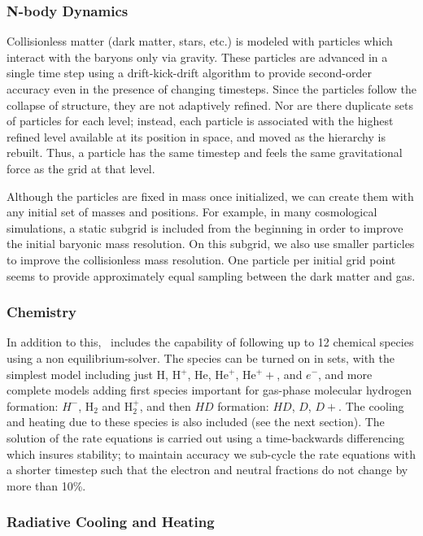 \subsubsection{N-body Dynamics}

Collisionless matter (dark matter, stars, etc.) is modeled with particles which interact with the baryons only via gravity.  These particles are advanced in a single time step using a drift-kick-drift algorithm to provide second-order accuracy even in the presence of changing timesteps.  Since the particles follow the collapse of structure, they are not adaptively refined.  Nor are there duplicate sets of particles for each level; instead, each particle is associated with the highest refined
level available at its position in space, and moved as the hierarchy is rebuilt.  Thus, a particle has the same timestep and feels the same gravitational force as the grid at that level.

Although the particles are fixed in mass once initialized, we can
create them with any initial set of masses and positions.  For example, in
many cosmological simulations, a static subgrid is included from the
beginning in order to improve the initial baryonic mass resolution.
On this subgrid, we also use smaller particles to improve the
collisionless mass resolution.  One particle per initial grid point
seems to provide approximately equal sampling between the dark matter
and gas.

\subsubsection{Chemistry}
\label{sec.ov.chem}

In addition to this, \enzo\ includes the capability of following up to 12 chemical species using a non equilibrium-solver.  The species can be turned on in sets, with the simplest model including just H, H$^+$, He, He$^+$, He$^++$, and $e^-$, and more complete models adding first species important for gas-phase molecular hydrogen formation: $H^-$, H$_2$ and H$_2^+$, and then $HD$ formation: $HD$, $D$, $D+$.  The cooling and heating due to these species is also included (see the next section).  The solution of the rate equations is carried out using a time-backwards differencing which insures stability; to maintain accuracy we sub-cycle the rate equations with a shorter timestep such that the electron and neutral fractions do not change by more than 10\%.

\subsubsection{Radiative Cooling and Heating}

